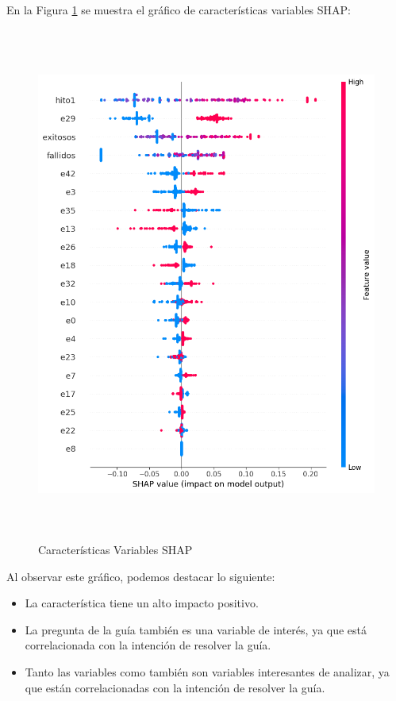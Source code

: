 En la Figura \ref{fig:caract_var_shap} se muestra el gráfico de características variables SHAP:

\begin{figure}[H]
    \centering
    \includegraphics[width=6.061in,height=6.686in]{img/shap_rf/shapForcePlot2.png}
    \caption{Características Variables SHAP}
    \label{fig:caract_var_shap}
\end{figure}

Al observar este gráfico, podemos destacar lo siguiente:

\begin{itemize}
    \item La característica  tiene un alto impacto positivo.
    \item La pregunta de la guía  también es una variable de interés, ya que está correlacionada con la intención de resolver la guía.
    \item Tanto las variables  como  también son variables interesantes de analizar, ya que están correlacionadas con la intención de resolver la guía.
\end{itemize}

